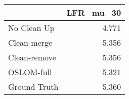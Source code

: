 \begin{tabular}{lr}
\toprule
{} & LFR_mu_30 \\
\midrule
No Clean Up  &     4.771 \\
Clean-merge  &     5.356 \\
Clean-remove &     5.356 \\
OSLOM-full   &     5.321 \\
Ground Truth &     5.360 \\
\bottomrule
\end{tabular}

